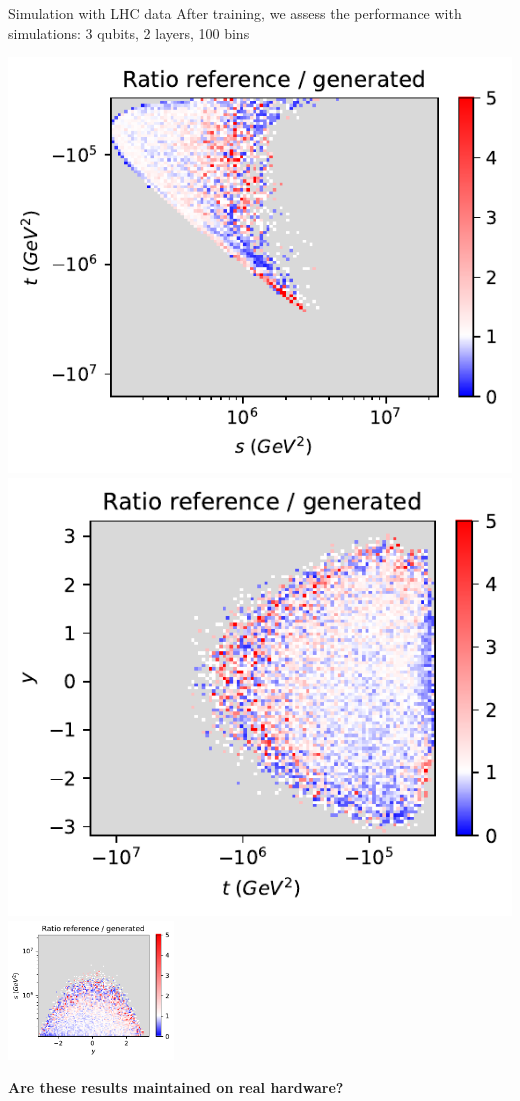 \documentclass[11pt,aspectratio=169]{beamer}
\begin{document}
\begin{frame}{Simulation with LHC data}
    After training, we assess the performance with simulations: 3 qubits, 2 layers, 100 bins

    \begin{multicols*}{3}
        \includegraphics[width=0.33 \textwidth]{figures/plots/LHCttbar/s-t_RATIO_100k.pdf}
        \includegraphics[width=0.33 \textwidth]{figures/plots/LHCttbar/t-y_RATIO_100k.pdf}
        \includegraphics[width=0.33\textwidth]{figures/plots/LHCttbar/y-s_RATIO_100k.pdf}
    \end{multicols*}
    \begin{center}
        { \color{red}
        \textbf{
            Are these results maintained on real hardware?}
        }
    \end{center}
    
\end{frame}
\end{document}
